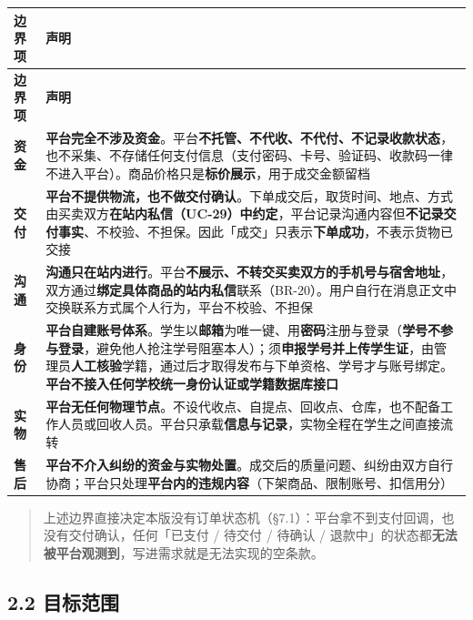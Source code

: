 \documentclass[12pt,a4paper]{ctexart}
\begin{document}
{\scriptsize
\begin{longtable}{|p{2.75cm}|p{13.25cm}|}
\hline
\textbf{边界项} & \textbf{声明} \\
\hline
\endfirsthead
\hline
\textbf{边界项} & \textbf{声明} \\
\hline
\endhead
\hline
\endfoot
\textbf{资金} & \textbf{平台完全不涉及资金}。平台\textbf{不托管、不代收、不代付、不记录收款状态}，也不采集、不存储任何支付信息（支付密码、卡号、验证码、收款码一律不进入平台）。商品价格只是\textbf{标价展示}，用于成交金额留档 \\
\hline
\textbf{交付} & \textbf{平台不提供物流，也不做交付确认}。下单成交后，取货时间、地点、方式由买卖双方\textbf{在站内私信（UC-29）中约定}，平台记录沟通内容但\textbf{不记录交付事实}、不校验、不担保。因此「成交」只表示\textbf{下单成功}，不表示货物已交接 \\
\hline
\textbf{沟通} & \textbf{沟通只在站内进行}。平台\textbf{不展示、不转交买卖双方的手机号与宿舍地址}，双方通过\textbf{绑定具体商品的站内私信}联系（BR-20）。用户自行在消息正文中交换联系方式属个人行为，平台不校验、不担保 \\
\hline
\textbf{身份} & \textbf{平台自建账号体系}。学生以\textbf{邮箱}为唯一键、用\textbf{密码}注册与登录（\textbf{学号不参与登录}，避免他人抢注学号阻塞本人）；须\textbf{申报学号并上传学生证}，由管理员\textbf{人工核验}学籍，通过后才取得发布与下单资格、学号才与账号绑定。\textbf{平台不接入任何学校统一身份认证或学籍数据库接口} \\
\hline
\textbf{实物} & \textbf{平台无任何物理节点}。不设代收点、自提点、回收点、仓库，也不配备工作人员或回收人员。平台只承载\textbf{信息与记录}，实物全程在学生之间直接流转 \\
\hline
\textbf{售后} & \textbf{平台不介入纠纷的资金与实物处置}。成交后的质量问题、纠纷由双方自行协商；平台只处理\textbf{平台内的违规内容}（下架商品、限制账号、扣信用分） \\
\hline
\end{longtable}
}


\begin{quote}\small
上述边界直接决定本版没有订单状态机（§7.1）：平台拿不到支付回调，也没有交付确认，任何「已支付 / 待交付 / 待确认 / 退款中」的状态都\textbf{无法被平台观测到}，写进需求就是无法实现的空条款。

\end{quote}

\subsection*{2.2 目标范围}
\end{document}
